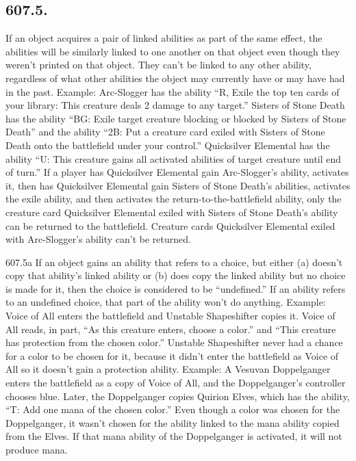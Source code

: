 \subsection*{607.5.}
If an object acquires a pair of linked abilities as part of the same effect, the abilities will be similarly linked to one another on that object even though they weren’t printed on that object. They can’t be linked to any other ability, regardless of what other abilities the object may currently have or may have had in the past.
Example: Arc-Slogger has the ability “{R}, Exile the top ten cards of your library: This creature deals 2 damage to any target.” Sisters of Stone Death has the ability “{B}{G}: Exile target creature blocking or blocked by Sisters of Stone Death” and the ability “{2}{B}: Put a creature card exiled with Sisters of Stone Death onto the battlefield under your control.” Quicksilver Elemental has the ability “{U}: This creature gains all activated abilities of target creature until end of turn.” If a player has Quicksilver Elemental gain Arc-Slogger’s ability, activates it, then has Quicksilver Elemental gain Sisters of Stone Death’s abilities, activates the exile ability, and then activates the return-to-the-battlefield ability, only the creature card Quicksilver Elemental exiled with Sisters of Stone Death’s ability can be returned to the battlefield. Creature cards Quicksilver Elemental exiled with Arc-Slogger’s ability can’t be returned.

607.5a If an object gains an ability that refers to a choice, but either (a) doesn’t copy that ability’s linked ability or (b) does copy the linked ability but no choice is made for it, then the choice is considered to be “undefined.” If an ability refers to an undefined choice, that part of the ability won’t do anything.
Example: Voice of All enters the battlefield and Unstable Shapeshifter copies it. Voice of All reads, in part, “As this creature enters, choose a color.” and “This creature has protection from the chosen color.” Unstable Shapeshifter never had a chance for a color to be chosen for it, because it didn’t enter the battlefield as Voice of All so it doesn’t gain a protection ability.
Example: A Vesuvan Doppelganger enters the battlefield as a copy of Voice of All, and the Doppelganger’s controller chooses blue. Later, the Doppelganger copies Quirion Elves, which has the ability, “{T}: Add one mana of the chosen color.” Even though a color was chosen for the Doppelganger, it wasn’t chosen for the ability linked to the mana ability copied from the Elves. If that mana ability of the Doppelganger is activated, it will not produce mana.


